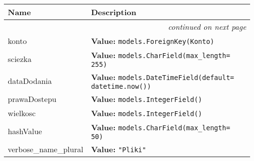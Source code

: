     \vspace{-1cm}
\hspace{\varindent}\begin{longtable}{|p{\varnamewidth}|p{\vardescrwidth}|l}
\cline{1-2}
\cline{1-2} \centering \textbf{Name} & \centering \textbf{Description}& \\
\cline{1-2}
\endhead\cline{1-2}\multicolumn{3}{r}{\small\textit{continued on next page}}\\\endfoot\cline{1-2}
\endlastfoot\raggedright k\-o\-n\-t\-o\- & \raggedright \textbf{Value:} 
{\tt models.ForeignKey(Konto)}&\\
\cline{1-2}
\raggedright s\-c\-i\-e\-z\-k\-a\- & \raggedright \textbf{Value:} 
{\tt models.CharField(max\_length= 255)}&\\
\cline{1-2}
\raggedright d\-a\-t\-a\-D\-o\-d\-a\-n\-i\-a\- & \raggedright \textbf{Value:} 
{\tt models.DateTimeField(default= datetime.now())}&\\
\cline{1-2}
\raggedright p\-r\-a\-w\-a\-D\-o\-s\-t\-e\-p\-u\- & \raggedright \textbf{Value:} 
{\tt models.IntegerField()}&\\
\cline{1-2}
\raggedright w\-i\-e\-l\-k\-o\-s\-c\- & \raggedright \textbf{Value:} 
{\tt models.IntegerField()}&\\
\cline{1-2}
\raggedright h\-a\-s\-h\-V\-a\-l\-u\-e\- & \raggedright \textbf{Value:} 
{\tt models.CharField(max\_length= 50)}&\\
\cline{1-2}
\raggedright v\-e\-r\-b\-o\-s\-e\-\_\-n\-a\-m\-e\-\_\-p\-l\-u\-r\-a\-l\- & \raggedright \textbf{Value:} 
{\tt "Pliki"}&\\
\cline{1-2}
\end{longtable}

